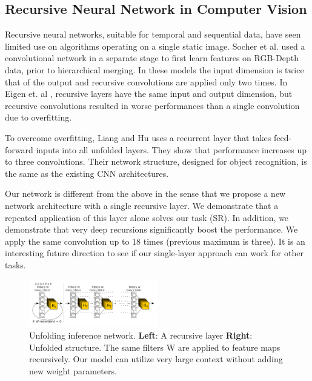\documentclass[10pt,twocolumn,letterpaper]{article}
\begin{document}
\subsection{Recursive Neural Network in Computer Vision}

%

Recursive neural networks, suitable for temporal and sequential data, have seen limited use on algorithms operating on a single static image.   Socher et al.  \cite{socher2012convolutional} used a convolutional network in a separate stage to first learn features on RGB-Depth data, prior to hierarchical merging. In these models the input dimension is twice that of the output and recursive convolutions are applied only two times. In Eigen et. al \cite{Eigen2014}, recursive layers have the same input and output dimension, but recursive convolutions resulted in worse performances than a single convolution due to overfitting. 

To overcome overfitting, Liang and Hu \cite{Liang_2015_CVPR} uses a recurrent layer that takes feed-forward inputs into all unfolded layers. They show that performance increases up to three convolutions. Their network structure, designed for object recognition, is the same as the existing CNN architectures.

Our network is different from the above in the sense that we propose a new network architecture with a single recursive layer. We demonstrate that a repeated application of this layer alone solves our task (SR). In addition, we demonstrate that very deep recursions significantly boost the performance. We apply the same convolution up to 18 times (previous maximum is three). It is an interesting future direction to see if our single-layer approach can work for other tasks.  

\begin{figure}[t]
	\includegraphics[width=0.5\textwidth]{figs/f2}
	\caption {Unfolding inference network. \textbf{Left}: A recursive layer \textbf{Right}: Unfolded structure. The same filters W are applied to feature maps recursively. Our model can utilize very large context without adding new weight parameters. }
	\label{fig:inference_network}
\end{figure}
\end{document}

